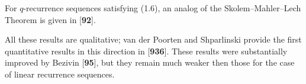 For $q$-recurrence sequences satisfying (1.6), an analog of the Skolem--Mahler--Lech Theorem is given in [{\bf 92}].

All these results are qualitative; van der Poorten and Shparlinski provide the first quantitative results in this direction in [{\bf 936}]. These results were substantially improved by Bezivin [{\bf 95}], but they remain much weaker then those for the case of linear recurrence sequences.
\bye 

